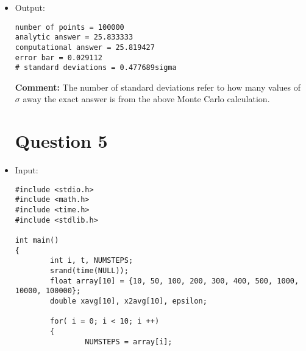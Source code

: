 \documentclass[10pt]{article}
\begin{document}
\begin{itemize}
\begin{verbatim}
        favg = 0;
        f2avg = 0;

        for(i = 0; i < NPOINTS; i++)
        {
                for(j = 0; j < 10; j++)
                {
                        x[j] = a + (b - a) * rand() / RAND_MAX;    //computes random values for x
                }
                
         //computes the values for <f> and <f>^2
         favg += pow(x[0] + x[1] + x[2] + x[3] + x[4] + x[5] + x[6] + x[7] + x[8] + x[9], 2);
         f2avg += pow(pow(x[0] + x[1] + x[2] + x[3] + x[4] + x[5] + x[6] + x[7] + x[8] + x[9], 2),2);
        }

        favg /= NPOINTS;
        f2avg /= NPOINTS;
        
        error = sqrt((f2avg - favg*favg)/ (NPOINTS - 1)); //error bar
        
        printf("number of points = %d\n", NPOINTS);
        printf("analytic answer = %f\n", exact);
        printf("computational answer = %f\n", (b - a) * favg);
        printf("error bar = %f\n", error);
        printf("# standard deviations = %fsigma\n", fabs((favg - exact) / error));

return 0;
}
\end{verbatim}
\item Output:
\begin{verbatim}
number of points = 100000
analytic answer = 25.833333
computational answer = 25.819427
error bar = 0.029112
# standard deviations = 0.477689sigma
\end{verbatim}

\textbf{Comment:} The number of standard deviations refer to how many values of $\sigma$ away the exact answer is from the above Monte Carlo calculation.

\section*{Question 5}
\item Input:
\begin{verbatim}
#include <stdio.h>
#include <math.h>
#include <time.h>
#include <stdlib.h>

int main()
{
        int i, t, NUMSTEPS;
        srand(time(NULL));
        float array[10] = {10, 50, 100, 200, 300, 400, 500, 1000, 10000, 100000};
        double xavg[10], x2avg[10], epsilon;
        
        for( i = 0; i < 10; i ++)
        {
                NUMSTEPS = array[i];


\end{verbatim}
\end{itemize}
\end{document}
